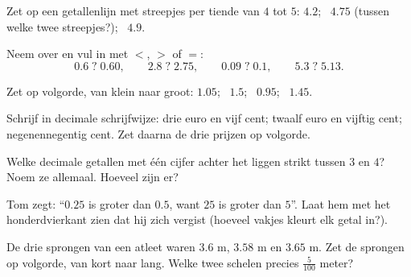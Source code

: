 \begin{exercise}[$\star$]\label{exo:g4:decimals:5}
Zet op een getallenlijn met streepjes per tiende van $4$ tot $5$:
$4.2$; \ $4.75$ (tussen welke twee streepjes?); \ $4.9$.
\end{exercise}

\begin{exercise}[$\star$]\label{exo:g4:decimals:6}
Neem over en vul in met $<$, $>$ of $=$:
\[
0.6 \;?\; 0.60, \qquad
2.8 \;?\; 2.75, \qquad
0.09 \;?\; 0.1, \qquad
5.3 \;?\; 5.13 .
\]
\end{exercise}

\begin{exercise}[$\star$]\label{exo:g4:decimals:7}
Zet op volgorde, van klein naar groot: $1.05$; \ $1.5$; \ $0.95$; \
$1.45$.
\end{exercise}

\begin{exercise}[$\star$]\label{exo:g4:decimals:8}
Schrijf in decimale schrijfwijze: drie euro en vijf cent; twaalf euro en
vijftig cent; negenennegentig cent. Zet daarna de drie prijzen op
volgorde.
\end{exercise}

\begin{exercise}[$\star$]\label{exo:g4:decimals:9}
Welke decimale getallen met één cijfer achter het  liggen
strikt tussen $3$ en $4$? Noem ze allemaal. Hoeveel zijn er?
\end{exercise}

\begin{exercise}[$\star\star$]\label{exo:g4:decimals:10}
Tom zegt: ``$0.25$ is groter dan $0.5$, want $25$ is groter dan $5$''. Laat
hem met het honderdvierkant zien dat hij zich vergist (hoeveel vakjes
kleurt elk getal in?).
\end{exercise}

\begin{exercise}[$\star\star$]\label{exo:g4:decimals:11}
De drie sprongen van een atleet waren $3.6$ m, $3.58$ m en $3.65$ m. Zet de
sprongen op volgorde, van kort naar lang. Welke twee schelen precies
$\frac{5}{100}$ meter?
\end{exercise}
